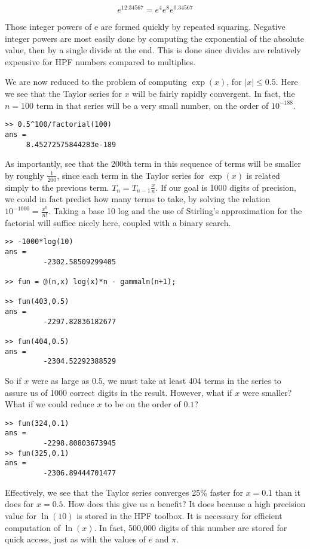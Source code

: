 \documentclass[a4paper,12pt]{article}
\begin{document}
\begin{equation}
    e^{12.34567} = e^4e^8e^{0.34567}
\end{equation}

Those integer powers of e are formed quickly by repeated squaring. Negative integer powers are most easily done by computing the exponential of the absolute value, then by a single divide at the end. This is done since divides are relatively expensive for HPF numbers compared to multiplies.

We are now reduced to the problem of computing $\exp(x)$, for $|x| \le 0.5$. Here we see that the Taylor series for $x$ will be fairly rapidly convergent. In fact, the $n = 100$ term in that series will be a very small number, on the order of ${10}^{-188}$.
\newpage
\begin{lstlisting}
>> 0.5^100/factorial(100)
ans =
     8.45272575844283e-189
\end{lstlisting}

As importantly, see that the 200th term in this sequence of terms will be smaller by roughly $\frac{1}{200}$, since each term in the Taylor series for $\exp(x)$ is related simply to the previous term. $T_n = T_{n-1}\frac{x}{n}$. If our goal is 1000 digits of precision, we could in fact predict how many terms to take, by solving the relation ${10}^{-1000} = \frac{x^n}{n!}$. Taking a base 10 log and the use of Stirling's approximation for the factorial will suffice nicely here, coupled with a binary search.

\begin{lstlisting}
>> -1000*log(10)
ans =
         -2302.58509299405

>> fun = @(n,x) log(x)*n - gammaln(n+1);

>> fun(403,0.5)
ans =
         -2297.82836182677

>> fun(404,0.5)
ans =
         -2304.52292388529
\end{lstlisting}

So if $x$ were as large as $0.5$, we must take at least 404 terms in the series to assure us of 1000 correct digits in the result. However, what if $x$ were smaller? What if we could reduce $x$ to be on the order of $0.1$?

\begin{lstlisting}
>> fun(324,0.1)
ans =
         -2298.80803673945
>> fun(325,0.1)
ans =
         -2306.89444701477
\end{lstlisting}

Effectively, we see that the Taylor series converges 25\% faster for $x = 0.1$ than it does for $x = 0.5$. How does this give us a benefit? It does because a high precision value for $\ln(10)$ is stored in the HPF toolbox. It is necessary for efficient computation of $\ln(x)$. In fact, 500,000 digits of this number are stored for quick access, just as with the values of $e$ and $\pi$.\vspace{-10pt}
\end{document}
